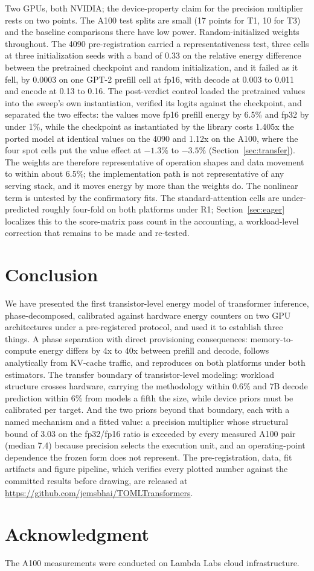 \documentclass[conference]{IEEEtran}
\begin{document}
Two GPUs, both NVIDIA; the device-property claim for the precision
multiplier rests on two points. The A100 test splits are small (17 points
for T1, 10 for T3) and the baseline comparisons there have low power.
Random-initialized weights throughout. The 4090 pre-registration carried a
representativeness test, three cells at three initialization seeds with a
band of 0.33 on the relative energy difference between the pretrained
checkpoint and random initialization, and it failed as it fell, by 0.0003
on one GPT-2 prefill cell at fp16, with decode at 0.003 to 0.011 and
encode at 0.13 to 0.16. The post-verdict control loaded the pretrained
values into the sweep's own instantiation, verified its logits against the
checkpoint, and separated the two effects: the values move fp16 prefill
energy by 6.5\% and fp32 by under 1\%, while the checkpoint as instantiated
by the library costs 1.405x the ported model at identical values on the
4090 and 1.12x on the A100, where the four spot cells put the value effect
at $-1.3\%$ to $-3.5\%$ (Section~\ref{sec:transfer}). The weights are
therefore representative of operation shapes and data movement to within
about 6.5\%; the implementation path is not representative of any serving
stack, and it moves energy by more than the weights do. The nonlinear term is
untested by the confirmatory fits. The standard-attention cells are
under-predicted roughly four-fold on both platforms under R1;
Section~\ref{sec:eager} localizes this to the score-matrix pass count in
the accounting, a workload-level correction that remains to be made and
re-tested.

\section{Conclusion}
\label{sec:conclusion}

We have presented the first transistor-level energy model of transformer
inference, phase-decomposed, calibrated against hardware energy counters on
two GPU architectures under a pre-registered protocol, and used it to
establish three things. A phase separation with direct provisioning
consequences: memory-to-compute energy differs by 4x to 40x between prefill
and decode, follows analytically from KV-cache traffic, and reproduces on
both platforms under both estimators. The transfer boundary of
transistor-level modeling: workload structure crosses hardware, carrying
the methodology within 0.6\% and 7B decode prediction within 6\% from
models a fifth the size, while device priors must be calibrated per target.
And the two priors beyond that boundary, each with a named mechanism and a
fitted value: a precision multiplier whose structural bound of 3.03 on the
fp32/fp16 ratio is exceeded by every measured A100 pair (median 7.4)
because precision selects the execution unit, and an operating-point
dependence the frozen form does not represent. The pre-registration, data,
fit artifacts and figure pipeline, which verifies every plotted number
against the committed results before drawing, are released at
\url{https://github.com/jemsbhai/TOMLTransformers}.

\section*{Acknowledgment}

The A100 measurements were conducted on Lambda Labs cloud infrastructure.



\end{document}
